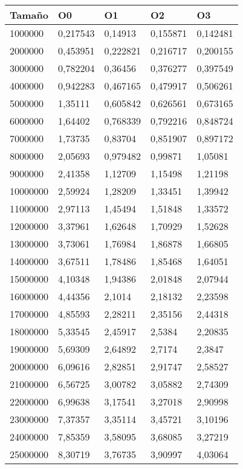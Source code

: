 \begin{tabular}{|l|l|l|l|l|}
	\hline
	Tamaño & O0 & O1 & O2 & O3 \\
	\hline
	\hline
	1000000 & 0,217543 & 0,14913 & 0,155871 & 0,142481 \\
	\hline
	2000000 & 0,453951 & 0,222821 & 0,216717 & 0,200155 \\
	\hline
	3000000 & 0,782204 & 0,36456 & 0,376277 & 0,397549 \\
	\hline
	4000000 & 0,942283 & 0,467165 & 0,479917 & 0,506261 \\
	\hline
	5000000 & 1,35111 & 0,605842 & 0,626561 & 0,673165 \\
	\hline
	6000000 & 1,64402 & 0,768339 & 0,792216 & 0,848724 \\
	\hline
	7000000 & 1,73735 & 0,83704 & 0,851907 & 0,897172 \\
	\hline
	8000000 & 2,05693 & 0,979482 & 0,99871 & 1,05081 \\
	\hline
	9000000 & 2,41358 & 1,12709 & 1,15498 & 1,21198 \\
	\hline
	10000000 & 2,59924 & 1,28209 & 1,33451 & 1,39942 \\
	\hline
	11000000 & 2,97113 & 1,45494 & 1,51848 & 1,33572 \\
	\hline
	12000000 & 3,37961 & 1,62648 & 1,70929 & 1,52628 \\
	\hline
	13000000 & 3,73061 & 1,76984 & 1,86878 & 1,66805 \\
	\hline
	14000000 & 3,67511 & 1,78486 & 1,85468 & 1,64051 \\
	\hline
	15000000 & 4,10348 & 1,94386 & 2,01848 & 2,07944 \\
	\hline
	16000000 & 4,44356 & 2,1014 & 2,18132 & 2,23598 \\
	\hline
	17000000 & 4,85593 & 2,28211 & 2,35156 & 2,44318 \\
	\hline
	18000000 & 5,33545 & 2,45917 & 2,5384 & 2,20835 \\
	\hline
	19000000 & 5,69309 & 2,64892 & 2,7174 & 2,3847 \\
	\hline
	20000000 & 6,09616 & 2,82851 & 2,91747 & 2,58527 \\
	\hline
	21000000 & 6,56725 & 3,00782 & 3,05882 & 2,74309 \\
	\hline
	22000000 & 6,99638 & 3,17541 & 3,27018 & 2,90998 \\
	\hline
	23000000 & 7,37357 & 3,35114 & 3,45721 & 3,10196 \\
	\hline
	24000000 & 7,85359 & 3,58095 & 3,68085 & 3,27219 \\
	\hline
	25000000 & 8,30719 & 3,76735 & 3,90997 & 4,03064 \\
	\hline
\end{tabular}
